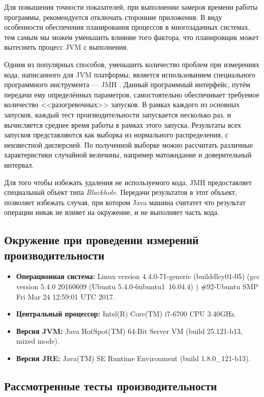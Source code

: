 Для повышения точности показателей, при выполнении замеров времени работы программы, рекомендуется отключать сторонние приложения. В виду особенности обеспечения планирования процессов в многозадачных системах, тем самым мы можем уменьшить влияние того фактора, что планировщик может вытеснить процесс JVM с выполнения.

Одним из популярных способов, уменьшить количество проблем при измерениях кода, написанного для JVM платформы, является использованием специального программного инструмента --- JMH \cite{java:jmh}. Данный программный интерфейс, путём передачи ему определённых параметров, самостоятельно обеспечивает требуемое количество <<разогревочных>> запусков. В рамках каждого из основных запусков, каждый тест производительности запускается несколько раз, и вычисляется среднее время работы в рамках этого запуска. Результаты всех запусков представляются как выборка из нормального распределения, с неизвестной дисперсией. По полученной выборке можно рассчитать различные характеристики случайной величины, например матожидание и доверительный интервал.

Для того чтобы избежать удаления не используемого кода, JMH предоставляет специальный объект типа \textit{Blackhole}. Передачи результатов в этот объъект, позволяет избежать случая, при котором Java машина считатет что результат операции никак не влияет на окружение, и не выполняет часть кода.

\subsection{Окружение при проведении измерений производительности}

\begin{itemize}
    \item \textbf{Операционная система:} Linux version 4.4.0-71-generic (buildd\at lcy01-05) (gcc version 5.4.0 20160609 (Ubuntu 5.4.0-6ubuntu1~16.04.4) ) \#92-Ubuntu SMP Fri Mar 24 12:59:01 UTC 2017.
    \item \textbf{Центральный процессор:}  Intel(R) Core(TM) i7-6700 CPU \at 3.40GHz.
    \item \textbf{Версия JVM:}  Java HotSpot(TM) 64-Bit Server VM (build 25.121-b13, mixed mode).
    \item \textbf{Версия JRE:}  Java(TM) SE Runtime Environment (build 1.8.0\_121-b13).
\end{itemize}


\subsection{Рассмотренные тесты производительности}

